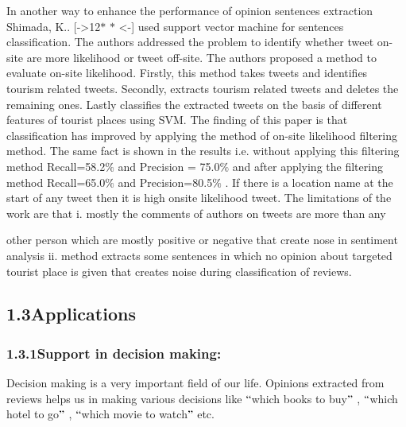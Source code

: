 \documentclass[12pt]{article}
\begin{document}
\vspace{\baselineskip}
\begin{justify}
\tab In another way to enhance the performance of opinion sentences extraction Shimada, K.. [->12$\ast$ $\ast$ <-] used support vector machine for sentences classification. The authors addressed the problem to identify whether tweet on-site are more likelihood or tweet off-site. The authors proposed a method to evaluate on-site likelihood. Firstly, this method takes tweets and identifies tourism related tweets. Secondly, extracts tourism related tweets and deletes the remaining ones. Lastly classifies the extracted tweets on the basis of different features of tourist places using SVM. The finding of this paper is that classification has improved by applying the method of on-site likelihood filtering method. The same fact is shown in the results i.e. without applying this filtering method Recall=58.2$\%$  and Precision = 75.0$\%$  and after applying the filtering method Recall=65.0$\%$  and Precision=80.5$\%$ . If there is a location name at the start of any tweet then it is high onsite likelihood tweet. The limitations of the work are that i. mostly the comments of authors on tweets are more than any
\end{justify}\par

\begin{justify}
other person which are mostly positive or negative that create nose in sentiment analysis ii. method extracts some sentences in which no opinion about targeted tourist place is given that creates noise during classification of reviews. 
\end{justify}\par


\vspace{\baselineskip}
 \par

\subsection*{1.3\hspace*{10pt}Applications}
\subsubsection*{1.3.1\hspace*{10pt}Support in decision making:}
\begin{justify}
Decision making is a very important field of our life. Opinions extracted from reviews helps us in making various decisions like $``$which books to buy$"$ , $``$which hotel to go$"$ , $``$which movie to watch$"$  etc.
\end{justify}\par
\end{document}

